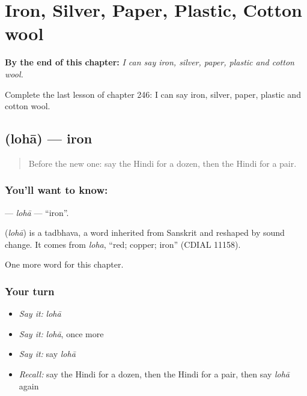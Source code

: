 
\chapter{Iron, Silver, Paper, Plastic, Cotton wool}
\label{ch:hi-iron-silver-paper-plastic-cotton-wool}

\begin{chapteropening}
\textbf{By the end of this chapter:} \emph{I can say iron, silver, paper, plastic and cotton wool.}

Complete the last lesson of chapter 246: I can say iron, silver, paper, plastic and cotton wool.
\end{chapteropening}

\section[\texorpdfstring{\hi{लोहा} (lohā)}{लोहा (lohā)}]{ (lohā) — iron}

\label{lesson:HI-C246-loha}



\begin{quote}
Before the new one: say the Hindi for a dozen, then the Hindi for a pair.
\end{quote}

\subsection*{You'll want to know: }
\textbf{} — \emph{lohā} — \textquotedblleft{}iron\textquotedblright{}.

\begin{cousinweb}
\textbf{} (\emph{lohā}) is a tadbhava, a word inherited from Sanskrit and reshaped by sound change. It comes from \emph{loha}, \textquotedblleft{}red; copper; iron\textquotedblright{} (CDIAL 11158).
\end{cousinweb}

\begin{grammarlens}[title={What you've built}]
One more word for this chapter.
\end{grammarlens}

\subsection*{Your turn}
\begin{itemize}
\raggedright
  \item \emph{Say it:} \emph{lohā}
  \item \emph{Say it:} \emph{lohā}, once more
  \item \emph{Say it:} say \emph{lohā}
  \item \emph{Recall:} say the Hindi for a dozen, then the Hindi for a pair, then say \emph{lohā} again
\end{itemize}

